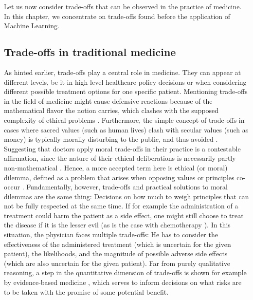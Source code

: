 Let us now consider trade-offs that can be observed in the practice of medicine.
In this chapter, we concentrate on trade-offs found before the application of Machine Learning.


\subsection{Trade-offs in traditional medicine}
    As hinted earlier, trade-offs play a central role in medicine.
	They can appear at different levels, be it in high level healthcare policy decisions or when considering different possible treatment options for one specific patient.
    Mentioning trade-offs in the field of medicine might cause defensive reactions because of the mathematical flavor the notion carries, which clashes with the supposed complexity of ethical problems \cite{Williamson2021}.
    Furthermore, the simple concept of trade-offs in cases where sacred values (such as human lives) clash with secular values (such as money) is typically morally disturbing to the public, and thus avoided \cite{Tetlock2003}.
    Suggesting that doctors apply moral trade-offs in their practice is a contestable affirmation, since the nature of their ethical deliberations is necessarily partly non-mathematical \cite{Zerilli2019}.
    Hence, a more accepted term here is ethical (or moral) dilemma, defined as a problem that arises when opposing values or principles co-occur \cite{Dijkstra2020}.
    Fundamentally, however, trade-offs and practical solutions to moral dilemmas are the same thing: Decisions on how much to weigh principles that can not be fully respected at the same time.
    If for example the administration of a treatment could harm the patient as a side effect, one might still choose to treat the disease if it is the lesser evil (as is the case with chemotherapy \cite{oronsky2016medical}).
    In this situation, the physician faces multiple trade-offs:
	He has to consider the effectiveness of the administered treatment (which is uncertain for the given patient), the likelihoods, and the magnitude of possible adverse side effects (which are also uncertain for the given patient).
    Far from purely qualitative reasoning, a step in the quantitative dimension of trade-offs is shown for example by evidence-based medicine \cite{Launer2020}, which serves to inform decisions on what risks are to be taken with the promise of some potential benefit.

